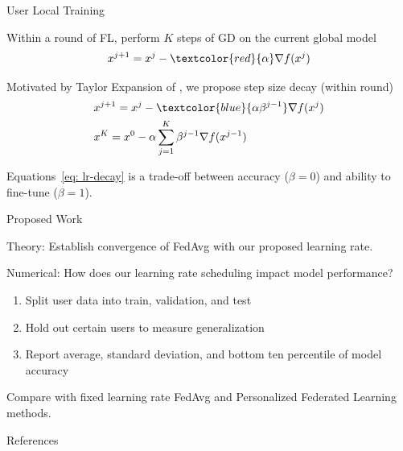 \documentclass{beamer}
\begin{document}
\begin{frame}{User Local Training}

    Within a round of FL, perform $K$ steps of GD on the current global model
    \begin{align}
        x^{j+1}=x^j-\textcolor{red}{\alpha}\nabla f(x^j)
    \end{align}

    Motivated by Taylor Expansion of \textcite{reptile}, we propose step size decay (within round)
    \begin{align}
        & x^{j+1}=x^j-\textcolor{blue}{\alpha\beta^{j-1}}\nabla f(x^j) \label{eq: lr-decay} \\
        & x^K = x^0 - \alpha\sum_{j=1}^K \beta^{j-1}\nabla f(x^{j-1}) \nonumber
    \end{align}

    Equations~\ref{eq: lr-decay} is a trade-off between accuracy ($\beta = 0$) and ability to fine-tune ($\beta = 1$). \\
    
\end{frame}


\begin{frame}[allowframebreaks]{Proposed Work}

    Theory: Establish convergence of FedAvg with our proposed learning rate.

    \bigskip
    Numerical: How does our learning rate scheduling impact model performance?
    \begin{enumerate}
        \item Split user data into train, validation, and test
        \item Hold out certain users to measure generalization
        \item Report average, standard deviation, and bottom ten percentile of model accuracy
    \end{enumerate}

    Compare with fixed learning rate FedAvg and Personalized Federated Learning methods.
    
\end{frame}

\begin{frame}[allowframebreaks]{References}
    \printbibliography
\end{frame}
\end{document}
